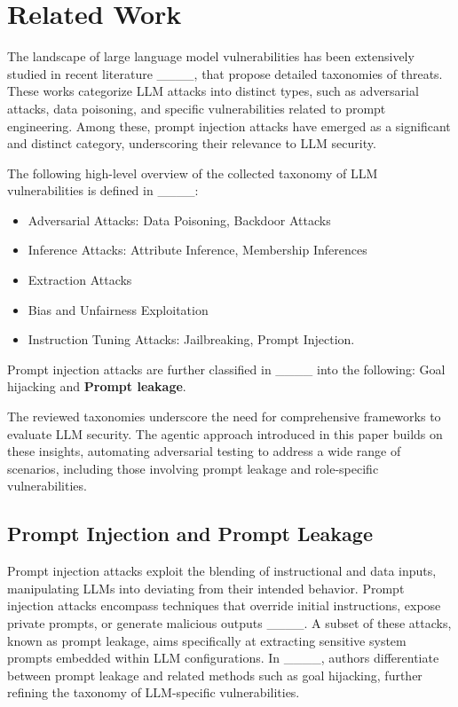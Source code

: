 \section{Related Work}
The landscape of large language model vulnerabilities has been extensively studied in recent literature ____, that propose detailed taxonomies of threats. These works categorize LLM attacks into distinct types, such as adversarial attacks, data poisoning, and specific vulnerabilities related to prompt engineering. Among these, prompt injection attacks have emerged as a significant and distinct category, underscoring their relevance to LLM security.

The following high-level overview of the collected taxonomy of LLM vulnerabilities is defined in ____:
\begin{itemize}
    \item Adversarial Attacks: Data Poisoning, Backdoor Attacks
    \item Inference Attacks: Attribute Inference, Membership Inferences
    \item Extraction Attacks
    \item Bias and Unfairness
Exploitation
    \item Instruction Tuning Attacks: Jailbreaking, Prompt Injection.
\end{itemize}
Prompt injection attacks are further classified in ____ into the following: Goal hijacking and \textbf{Prompt leakage}.

The reviewed taxonomies underscore the need for comprehensive frameworks to evaluate LLM security. The agentic approach introduced in this paper builds on these insights, automating adversarial testing to address a wide range of scenarios, including those involving prompt leakage and role-specific vulnerabilities.

\subsection{Prompt Injection and Prompt Leakage}

Prompt injection attacks exploit the blending of instructional and data inputs, manipulating LLMs into deviating from their intended behavior. Prompt injection attacks encompass techniques that override initial instructions, expose private prompts, or generate malicious outputs ____. A subset of these attacks, known as prompt leakage, aims specifically at extracting sensitive system prompts embedded within LLM configurations. In ____, authors differentiate between prompt leakage and related methods such as goal hijacking, further refining the taxonomy of LLM-specific vulnerabilities.

